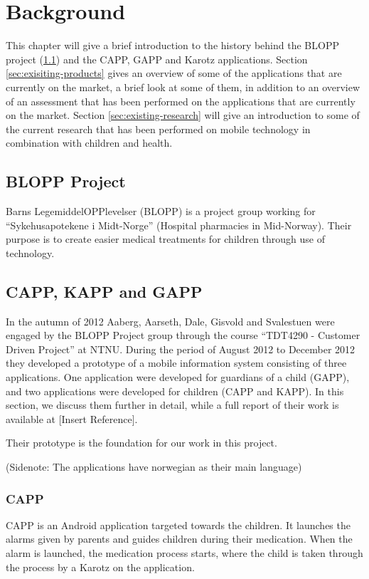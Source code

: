 \chapter{Background}
\label{chp:background}


This chapter will give a brief introduction to the history behind the BLOPP project (\ref{sec:bloppproject}) and the CAPP, GAPP and Karotz applications. 
Section \ref{sec:exisiting-products} gives an overview of some of the applications that are currently on the market, a brief look at some of them, in addition to an overview of an assessment that has been performed on the applications that are currently on the market.   
Section \ref{sec:existing-research} will give an introduction to some of the current research that has been performed on mobile technology in combination with children and health.   


\section{BLOPP Project}
\label{sec:bloppproject}
Barns LegemiddelOPPlevelser (BLOPP) is a project group working for ``Sykehusapotekene i Midt-Norge'' (Hospital pharmacies in Mid-Norway). Their purpose is to create easier medical treatments for children through use of technology.   


\section{CAPP, KAPP and GAPP}
\label{sec:cappgappkapp}
In the autumn of 2012 Aaberg, Aarseth, Dale, Gisvold and Svalestuen were engaged by the BLOPP Project group through the course ``TDT4290 - Customer Driven Project'' \cite{customerdrivenntnu} at NTNU. During the period of August 2012 to December 2012 they developed a prototype of a mobile information system consisting of three applications. One application were developed for guardians of a child (GAPP), and two applications were developed for children (CAPP and KAPP). In this section, we discuss them further in detail, while a full report of their work is available at [Insert Reference].

Their prototype is the foundation for our work in this project.

(Sidenote: The applications have norwegian as their main language) %

\subsection{CAPP}
CAPP is an Android application targeted towards the children. It launches the alarms given by parents and guides children during their medication. When the alarm is launched, the medication process starts, where the child is taken through the process by a Karotz on the application. 


